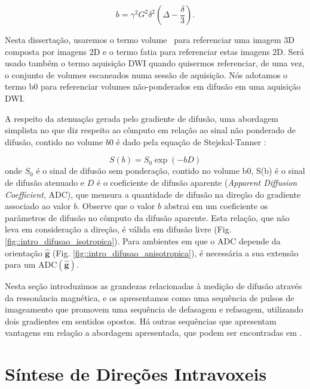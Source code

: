 \documentclass[
    12pt,                %
    oneside,            %
    a4paper,            %
    english,            %
    french,                %
    spanish,            %
    brazil                %
    ]{abntex2}
\begin{document}
\begin{equation}
\label{eq::bvalue}
    b = \gamma^2G^2\delta^2(\Delta - \frac{\delta}{3}).
\end{equation}

Nesta dissertação, usaremos o termo \textsf{volume} ~para referenciar uma imagem 3D composta por imagens 2D e o termo \textsf{fatia} para referenciar estas imagens 2D. Será usado também o termo \textsf{aquisição DWI} quando quisermos referenciar, de uma vez, o conjunto de volumes escaneados numa sessão de aquisição. Nós adotamos o termo \textsf{b0}  para referenciar volumes não-ponderados em difusão em uma aquisição DWI.



A respeito da atenuação gerada pelo gradiente de difusão, uma abordagem simplista no que diz respeito ao cômputo em relação ao sinal não ponderado de difusão, contido no volume $b0$ é dado pela equação de Stejskal-Tanner \cite{DTI_Handbook}:

\begin{equation}
\label{eq::stanner}
    S(b) = S_0\exp{(-bD)}
\end{equation}
onde $S_0$ é o sinal de difusão sem ponderação, contido no volume b0, S(b) é o sinal de difusão atenuado e $D$ é o coeficiente de difusão aparente (\textit{Apparent Diffusion Coefficient}, ADC), que mensura a quantidade de difusão na direção do gradiente associado ao valor $b$. Observe que o valor $b$ abstrai em um coeficiente os parâmetros de difusão no cômputo da difusão aparente. Esta relação, que não leva em consideração a direção, é válida em difusão livre (Fig. \ref{fig::intro_difusao_isotropica}). Para ambientes em que o ADC depende da orientação $\mathbf{\hat{g}}$ (Fig. \ref{fig::intro_difusao_anisotropica}), é necessária a sua extensão para um ADC$(\mathbf{\hat{g}})$.

\todo{\textcolor{green}{Adicionei este parágrafo pois acho importante frisar que esta sequência não é única e há outras com mais vantagens, mas que fogem do escopo do trabalho}}

Nesta seção introduzimos as grandezas relacionadas à medição de difusão através da ressonância magnética, e os apresentamos como uma sequência de pulsos de imageamento que promovem uma sequência de defasagem e refasagem, utilizando dois gradientes em sentidos opostos. Há outras sequências que apresentam vantagens em relação a abordagem apresentada, que podem ser encontradas em .

\section{Síntese de Direções Intravoxeis}
\end{document}
